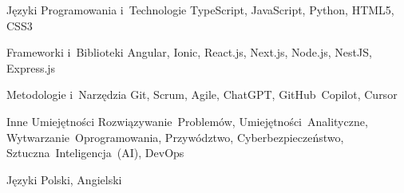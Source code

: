 
\begin{cvskills}

  \cvskill
    {Języki Programowania i~Technologie} %
    {TypeScript, JavaScript, Python, HTML5, CSS3} %

  \cvskill
    {Frameworki i~Biblioteki} %
    {Angular, Ionic, React.js, Next.js, Node.js, NestJS, Express.js} %

  \cvskill
    {Metodologie i~Narzędzia} %
    {Git, Scrum, Agile, ChatGPT, GitHub~Copilot, Cursor} %

  \cvskill
    {Inne Umiejętności} %
    {Rozwiązywanie~Problemów, Umiejętności~Analityczne, Wytwarzanie~Oprogramowania, Przywództwo, Cyberbezpieczeństwo, Sztuczna~Inteligencja~(AI), DevOps} %

  \cvskill
    {Języki} %
    {Polski, Angielski} %

\end{cvskills}

